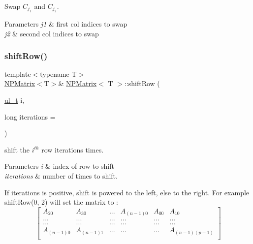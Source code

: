 Swap $ C_{j_1} $ and $ C_{j_2} $. 


\begin{DoxyParams}{Parameters}
{\em j1} & first col indices to swap \\
\hline
{\em j2} & second col indices to swap \\
\hline
\end{DoxyParams}
\mbox{\label{class_n_p_matrix_a8927e2dc64af30c6f619a93678332093}} 
\subsubsection{\texorpdfstring{shiftRow()}{shiftRow()}}
{\footnotesize\ttfamily template$<$typename T$>$ \\
\mbox{\hyperlink{class_n_p_matrix}{N\+P\+Matrix}}$<$T$>$\& \mbox{\hyperlink{class_n_p_matrix}{N\+P\+Matrix}}$<$ T $>$\+::shift\+Row (\begin{DoxyParamCaption}\item[{\mbox{\hyperlink{group___n_algebra_ga1b140a2034db3f5dfe18a987745df43a}{ul\+\_\+t}}}]{i,  }\item[{long}]{iterations = {} }\end{DoxyParamCaption})\hspace{0.3cm}{\ttfamily [inline]}}



shift the $ i^{th} $ row {\ttfamily iterations} times. 


\begin{DoxyParams}{Parameters}
{\em i} & index of row to shift \\
\hline
{\em iterations} & number of times to shift.\\
\hline
\end{DoxyParams}
If {\ttfamily iterations} is positive, shift is powered to the left, else to the right. For example {\ttfamily shift\+Row(0, 2)} will set the matrix to \+: \[ \begin{bmatrix} A_{20} & A_{30} & ... & A_{(n-1)0} & A_{00} & A_{10} \\ ... & ... & ... & ... & ... & ... \\ ... & ... & ... & ... & ... & ... \\ A_{(n-1)0} & A_{(n-1)1} & ... & ... & ... & A_{(n-1)(p-1)}\\ \end{bmatrix} \] \mbox{\label{class_n_p_matrix_ae039695bf1464be6563f81d6e0c502d8}} 
